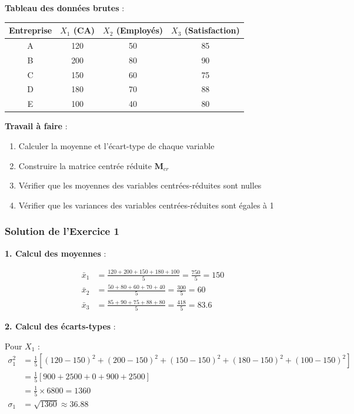 \documentclass[11pt,a4paper]{article}
\begin{document}
\textbf{Tableau des données brutes} :

\begin{table}[h]
\centering
\begin{tabular}{|c|c|c|c|}
\hline
\textbf{Entreprise} & $X_1$ (CA) & $X_2$ (Employés) & $X_3$ (Satisfaction) \\
\hline
A & 120 & 50 & 85 \\
\hline
B & 200 & 80 & 90 \\
\hline
C & 150 & 60 & 75 \\
\hline
D & 180 & 70 & 88 \\
\hline
E & 100 & 40 & 80 \\
\hline
\end{tabular}
\end{table}

\textbf{Travail à faire} :
\begin{enumerate}
    \item Calculer la moyenne et l'écart-type de chaque variable
    \item Construire la matrice centrée réduite $\mathbf{M}_{cr}$
    \item Vérifier que les moyennes des variables centrées-réduites sont nulles
    \item Vérifier que les variances des variables centrées-réduites sont égales à 1
\end{enumerate}

\subsubsection{Solution de l'Exercice 1}

\textbf{1. Calcul des moyennes} :

\begin{align*}
\bar{x}_1 &= \frac{120 + 200 + 150 + 180 + 100}{5} = \frac{750}{5} = 150 \\
\bar{x}_2 &= \frac{50 + 80 + 60 + 70 + 40}{5} = \frac{300}{5} = 60 \\
\bar{x}_3 &= \frac{85 + 90 + 75 + 88 + 80}{5} = \frac{418}{5} = 83.6
\end{align*}

\textbf{2. Calcul des écarts-types} :

Pour $X_1$ :
\begin{align*}
\sigma_1^2 &= \frac{1}{5}[(120-150)^2 + (200-150)^2 + (150-150)^2 + (180-150)^2 + (100-150)^2] \\
&= \frac{1}{5}[900 + 2500 + 0 + 900 + 2500] \\
&= \frac{1}{5} \times 6800 = 1360 \\
\sigma_1 &= \sqrt{1360} \approx 36.88
\end{align*}
\end{document}

